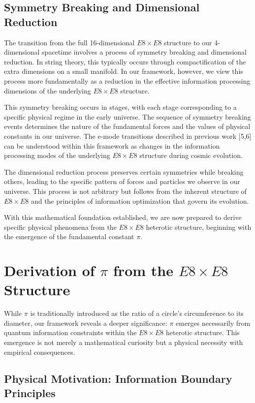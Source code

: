 \documentclass[11pt,english,twoside]{article}
\begin{document}
    
\subsection{Symmetry Breaking and Dimensional Reduction}

The transition from the full 16-dimensional $E8\times E8$ structure to our 4-dimensional spacetime involves a process of symmetry breaking and dimensional reduction. In string theory, this typically occurs through compactification of the extra dimensions on a small manifold. In our framework, however, we view this process more fundamentally as a reduction in the effective information processing dimensions of the underlying $E8\times E8$ structure.

This symmetry breaking occurs in stages, with each stage corresponding to a specific physical regime in the early universe. The sequence of symmetry breaking events determines the nature of the fundamental forces and the values of physical constants in our universe. The e-mode transitions described in previous work [5,6] can be understood within this framework as changes in the information processing modes of the underlying $E8\times E8$ structure during cosmic evolution.

The dimensional reduction process preserves certain symmetries while breaking others, leading to the specific pattern of forces and particles we observe in our universe. This process is not arbitrary but follows from the inherent structure of $E8\times E8$ and the principles of information optimization that govern its evolution.

With this mathematical foundation established, we are now prepared to derive specific physical phenomena from the $E8\times E8$ heterotic structure, beginning with the emergence of the fundamental constant $\pi$.

\section{Derivation of $\pi$ from the $E8\times E8$ Structure}

While $\pi$ is traditionally introduced as the ratio of a circle's circumference to its diameter, our framework reveals a deeper significance: $\pi$ emerges necessarily from quantum information constraints within the $E8\times E8$ heterotic structure. This emergence is not merely a mathematical curiosity but a physical necessity with empirical consequences.

\subsection{Physical Motivation: Information Boundary Principles}
\end{document}
